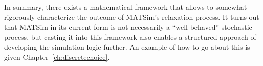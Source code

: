 

In summary, there exists a mathematical framework that allows to somewhat
rigorously characterize the outcome of MATSim's relaxation process.
It turns out that MATSim in its current form is not necessarily a ``well-behaved''
stochastic process, but casting it into this framework also enables a structured
approach of developing the simulation logic further. An example of how to go
about this is given Chapter~\ref{ch:discretechoice}.




